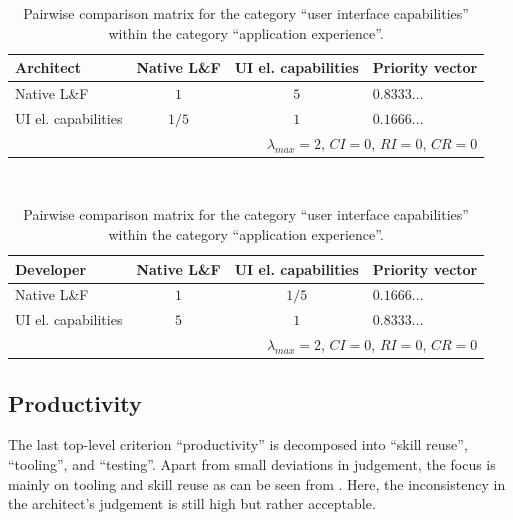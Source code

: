 \begin{table}[h!]
    \centering
    \begin{tabular}{lccl}
        \hline
        \textbf{Architect}  & Native L\&F & UI el. capabilities & Priority vector \\
        \hline
        Native L\&F         & $1$         & $5$                 & $0.8333\ldots$  \\
        UI el. capabilities & $1/5$       & $1$                 & $0.1666\ldots$  \\
        \hline
        \multicolumn{4}{r}{$\lambda_{max} = 2$, $CI = 0$, $RI = 0$, $CR = 0$}     \\
        \hline
    \end{tabular}
    \\\vspace{1em}
    \begin{tabular}{lccl}
        \hline
        \textbf{Developer}  & Native L\&F & UI el. capabilities & Priority vector \\
        \hline
        Native L\&F         & $1$         & $1/5$               & $0.1666\ldots$  \\
        UI el. capabilities & $5$         & $1$                 & $0.8333\ldots$  \\
        \hline
        \multicolumn{4}{r}{$\lambda_{max} = 2$, $CI = 0$, $RI = 0$, $CR = 0$}     \\
        \hline
    \end{tabular}
    \caption{Pairwise comparison matrix for the category ``user interface capabilities'' within the category ``application experience''.}
    \label{tab:ui}
\end{table}

\subsection{Productivity}

The last top-level criterion ``productivity'' is decomposed into ``skill reuse'', ``tooling'', and ``testing''. Apart from small deviations in judgement, the focus is mainly on tooling and skill reuse as can be seen from . Here, the inconsistency in the architect's judgement is still high but rather acceptable.

